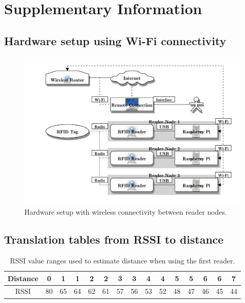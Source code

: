 \chapter{Supplementary Information}
\label{ap:appendix}

\section{Hardware setup using Wi-Fi connectivity}
\label{sec:hardsetwifi}

\begin{figure}[h]
	\begin{center}
		\includegraphics[width=1\textwidth]{figures/blockdiag/hardwaredesignwifi}
		\caption{Hardware setup with wireless connectivity between reader nodes.}
		\label{fig:hardsetwifi}
	\end{center}
\end{figure}

\newpage
\section{Translation tables from RSSI to distance}
\label{sec:trans}

\begin{table}[h]
	\centering
	\begin{tabular}{ | c | c | c || c | c || c | c || c | c || c | c || c | c || c | c | }
		\hline
		Distance 	& 0  & 1  & 1  & 2  & 2  & 3  & 3  & 4  & 4  & 5  & 5  & 6  & 6  & 7  \\ \hline
		RSSI 		& 80 & 65 & 64 & 62 & 61 & 57 & 56 & 53 & 52 & 48 & 47 & 46 & 45 & 44  \\ \hline
	\end{tabular}
	\caption{RSSI value ranges used to estimate distance when using the first reader. }
	\label{tbl:trans1}
\end{table}

